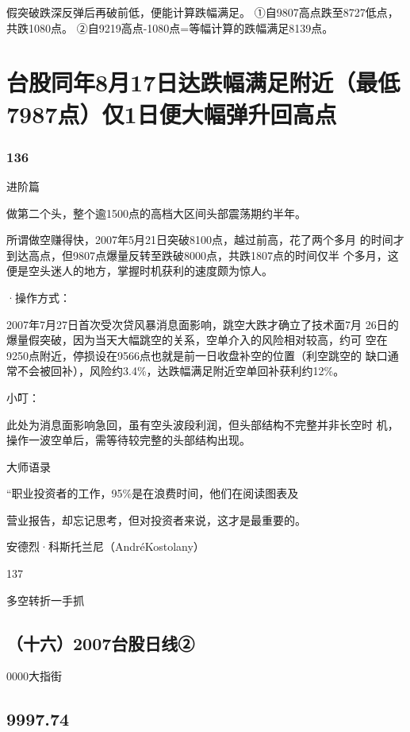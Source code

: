 \documentclass{article}
\begin{document}
假突破跌深反弹后再破前低，便能计算跌幅满足。 ①自9807高点跌至8727低点，共跌1080点。 ②自9219高点-1080点=等幅计算的跌幅满足8139点。

\section{台股同年8月17日达跌幅满足附近（最低7987点）仅1日便大幅弹升回高点}

\subsubsection{136}

\clearpage

进阶篇

做第二个头，整个逾1500点的高档大区间头部震荡期约半年。

所谓做空赚得快，2007年5月21日突破8100点，越过前高，花了两个多月 的时间才到达高点，但9807点爆量反转至跌破8000点，共跌1807点的时间仅半 个多月，这便是空头迷人的地方，掌握时机获利的速度颇为惊人。

·操作方式：

2007年7月27日首次受次贷风暴消息面影响，跳空大跌才确立了技术面7月 26日的爆量假突破，因为当天大幅跳空的关系，空单介入的风险相对较高，约可 空在9250点附近，停损设在9566点也就是前一日收盘补空的位置（利空跳空的 缺口通常不会被回补），风险约3.4\%，达跌幅满足附近空单回补获利约12\%。

小叮：

此处为消息面影响急回，虽有空头波段利润，但头部结构不完整并非长空时 机，操作一波空单后，需等待较完整的头部结构出现。

大师语录

“职业投资者的工作，95\%是在浪费时间，他们在阅读图表及

营业报告，却忘记思考，但对投资者来说，这才是最重要的。

安德烈·科斯托兰尼（AndréKostolany）

137

\clearpage

多空转折一手抓

\subsection{（十六）2007台股日线②}

0000大指街

\subsection{9997.74}
\end{document}
